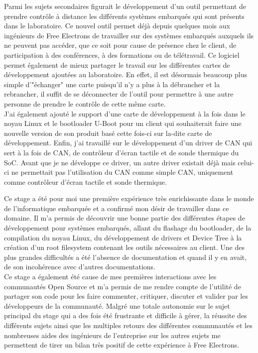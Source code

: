 Parmi les sujets secondaires figurait le développement d'un outil permettant de prendre contrôle à distance les différents systèmes embarqués qui sont présents dans le laboratoire. Ce nouvel outil permet déjà depuis quelques mois aux ingénieurs de Free Electrons de travailler sur des systèmes embarqués auxquels ils ne peuvent pas accéder, que ce soit pour cause de présence chez le client, de participation à des conférences, à des formations ou de télétravail. Ce logiciel permet également de mieux partager le travail sur les différentes cartes de développement ajoutées au laboratoire. En effet, il est désormais beaucoup plus simple d'"échanger" une carte puisqu'il n'y a plus à la débrancher et la rebrancher, il suffit de se déconnecter de l'outil pour permettre à une autre personne de prendre le contrôle de cette même carte.\\
J'ai également ajouté le support d'une carte de développement à la fois dans le noyau Linux et le bootloader U-Boot pour un client qui souhaiterait faire une nouvelle version de son produit basé cette fois-ci sur la-dite carte de développement. Enfin, j'ai travaillé sur le développement d'un driver de CAN qui sert à la fois de CAN, de contrôleur d'écran tactile et de sonde thermique du SoC. Avant que je ne développe ce driver, un autre driver existait déjà mais celui-ci ne permettait pas l'utilisation du CAN comme simple CAN, uniquement comme contrôleur d'écran tactile et sonde thermique.

Ce stage a été pour moi une première expérience très enrichissante dans le monde de l'informatique embarquée et a confirmé mon désir de travailler dans ce domaine. Il m'a permis de découvrir une bonne partie des différentes étapes de développement pour systèmes embarqués, allant du flashage du bootloader, de la compilation du noyau Linux, du développement de drivers et Device Tree à la création d'un root filesystem contenant les outils nécessaires au client. Une des plus grandes difficultés a été l'absence de documentation et quand il y en avait, de son incohérence avec d'autres documentations.\\
Ce stage a également été cause de mes premières interactions avec les communautés Open Source et m'a permis de me rendre compte de l'utilité de partager son code pour les faire commenter, critiquer, discuter et valider par les développeurs de la communauté. Malgré une totale autonomie sur le sujet principal du stage qui a des fois été frustrante et difficile à gérer, la réussite des différents sujets ainsi que les multiples retours des différentes communautés et les nombreuses aides des ingénieurs de l'entreprise sur les autres sujets me permettent de tirer un bilan très positif de cette expérience à Free Electrons.
